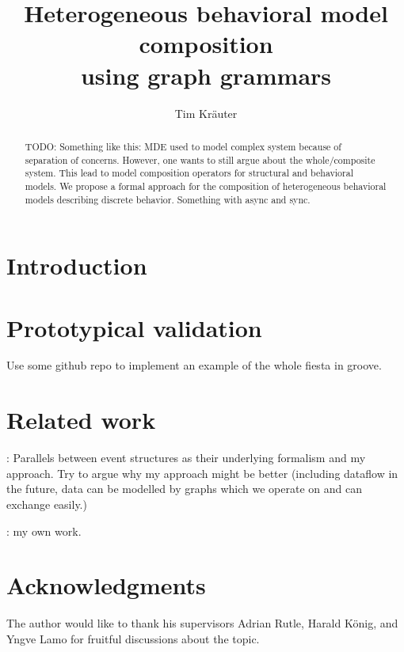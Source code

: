 \documentclass[a4paper]{easychair}
\title{Heterogeneous behavioral model composition \\
        using graph grammars}
\author{
Tim Kräuter\inst{1}
}
\institute{
  Høgskulen på Vestlandet\\
  Bergen, Norway\\
  \email{tkra@hvl.no}
 }
\begin{document}
\maketitle

\begin{abstract}
TODO: Something like this:
  MDE used to model complex system because of separation of concerns. However, one wants to still argue about the whole/composite system. This lead to model composition operators for structural and behavioral models. We propose a formal approach for the composition of heterogeneous behavioral models describing discrete behavior.
  Something with async and sync.
\end{abstract}


\section{Introduction}


\section{Prototypical validation}
Use some github repo to implement an example of the whole fiesta in groove.

\section{Related work}
\cite{kienzleUnifyingFrameworkHomogeneous2019}:
Parallels between event structures as their underlying formalism and my approach.
Try to argue why my approach might be better (including dataflow in the future, data can be modelled by graphs which we operate on and can exchange easily.)

\cite{krauterBehavioralConsistencyHeterogeneous2021}: my own work.
\section{Acknowledgments} \label{sect:acks}
The author would like to thank his supervisors Adrian Rutle, Harald König, and Yngve Lamo for fruitful discussions about the topic.
\label{sect:bib}

%
%
%



\end{document}
